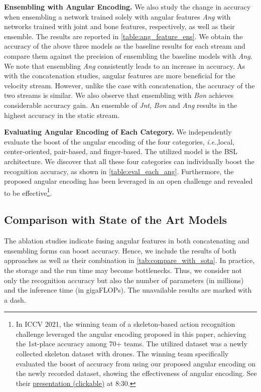 \documentclass[journal,comsoc]{IEEEtran}
\newcommand{\ie}{\textit{i}.\textit{e}.,}
\begin{document}
\textbf{Ensembling with Angular Encoding.}
We also study the change in accuracy when ensembling a network trained solely with angular features \emph{Ang} with networks trained with joint and bone features, respectively, as well as their ensemble. The results are reported in \autoref{table:ang_feature_ens}.
We obtain the accuracy of the above three models as the baseline results for each stream and compare them against the precision of ensembling the baseline models with \emph{Ang}.
We note that ensembling \emph{Ang} consistently leads to an increase in accuracy. As with the concatenation studies, angular features are more beneficial for the velocity stream.
However, unlike the case with concatenation, the accuracy of the two streams is similar. We also observe that ensembling with \emph{Bon} achieves considerable accuracy gain. An ensemble of \emph{Jnt}, \emph{Bon} and \emph{Ang} results in the highest accuracy in the static stream.

\textbf{Evaluating Angular Encoding of Each Category. }
We independently evaluate the boost of the angular encoding of the four categories, \ie local, center-oriented, pair-based, and finger-based. The utilized model is the BSL architecture. We discover that all these four categories can individually boost the recognition accuracy, as shown in \autoref{table:eval_each_ang}. Furthermore, the proposed angular encoding has been leveraged in an open challenge and revealed to be effective\footnote{In ICCV 2021, the winning team of a skeleton-based action recognition challenge leveraged the angular encoding proposed in this paper, achieving the 1st-place accuracy among 70+ teams. The utilized dataset was a newly collected skeleton dataset with drones. The winning team specifically evaluated the boost of accuracy from using our proposed angular encoding on the newly recorded dataset, showing the effectiveness of angular encoding. See their  \href{https://sutdapac-my.sharepoint.com/:v:/g/personal/jun_liu_sutd_edu_sg/EYL7JHl-f2FPvo95wmyoX88Bp_pn71wjgv6J4uiIZGACeA?e=UfLYPs}{presentation (clickable)} at 8:30. }. 

 \subsection{Comparison with State of the Art Models}
The ablation studies indicate fusing angular features in both concatenating and ensembling forms can boost accuracy. Hence, we include the results of both approaches as well as their combination in \autoref{tab:compare_with_sota}. In practice, the storage and the run time may become bottlenecks. Thus, we consider not only the recognition accuracy but also the number of parameters (in millions) and the inference time (in gigaFLOPs). 
The unavailable results are marked with a dash. 
\end{document}
